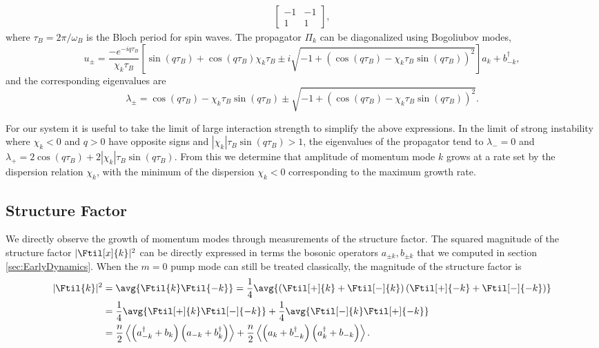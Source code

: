 \begin{bibunit}
\begin{equation}
\begin{aligned}
\begin{bmatrix}
    -1 & -1  \\
   1 & 1
\end{bmatrix}, 
\end{aligned}
\end{equation}
where $\tau_B = 2\pi/\omega_B$ is the Bloch period for spin waves. The propagator $\Pi_k$ can be diagonalized using Bogoliubov modes, 
\begin{equation}
u_\pm = \frac{-e^{-iq\tau_B}}{\chi_k\tau_B}\left[\sin(q\tau_B) + \cos(q\tau_B)\chi_k\tau_B \pm i \sqrt{-1+\left(\cos(q\tau_B)-\chi_k\tau_B\sin(q\tau_B)\right)^2 } \right] a_k + b_{-k}^\dagger,
\end{equation}
and the corresponding eigenvalues are
\begin{equation}
\lambda_\pm = \cos(q\tau_B) - \chi_k\tau_B \sin(q\tau_B) \pm \sqrt{-1+\left(\cos(q\tau_B)-\chi_k\tau_B\sin(q\tau_B) \right)^2 }.
\end{equation}

For our system it is useful to take the limit of large interaction strength to simplify the above expressions. In the limit of strong instability where $\chi_k <0 $ and $q >0$ have opposite signs and $|\chi_k|\tau_B\sin(q\tau_B) > 1$, the eigenvalues of the propagator tend to $\lambda_- = 0$ and $\lambda_+ = 2\cos(q\tau_B)+ 2|\chi_k|\tau_B\sin(q\tau_B)$. From this we determine that amplitude of momentum mode $k$ grows at a rate set by the dispersion relation $\chi_k$, with the minimum of the dispersion $\chi_k < 0$ corresponding to the maximum growth rate.

\subsection{Structure Factor}
We directly observe the growth of momentum modes through measurements of the structure factor. The squared magnitude of the structure factor $|\Ftil[x]{k}|^2$ can be directly expressed in terms the bosonic operators $a_{\pm k}, b_{\pm k}$ that we computed in section \ref{sec:EarlyDynamics}. When the $m=0$ pump mode can still be treated classically, the magnitude of the structure factor is
\begin{equation}
\begin{aligned}
|\Ftil{k}|^2 &= 
\avg{ \Ftil{k} \Ftil{-k}} =
\frac{1}{4}\avg{\left(\Ftil[+]{k} + \Ftil[-]{k}\right) \left(\Ftil[+]{-k}+\Ftil[-]{-k} \right)} \\
&=\frac{1}{4}\avg{\Ftil[+]{k}\Ftil[-]{-k}} + \frac{1}{4}\avg{\Ftil[-]{k}\Ftil[+]{-k}} \\
&= \frac{n}{2} \left\langle \left(a_{-k}^\dagger + b_{k} \right)\left(a_{-k} + b_{k}^\dagger \right) \right\rangle + \frac{n}{2}\left\langle \left(a_{k} + b_{-k}^\dagger \right)\left(a_{k}^\dagger + b_{-k}\right) \right\rangle.
\label{Seq:structure_factor_modes}
\end{aligned}
\end{equation}


\end{bibunit}
